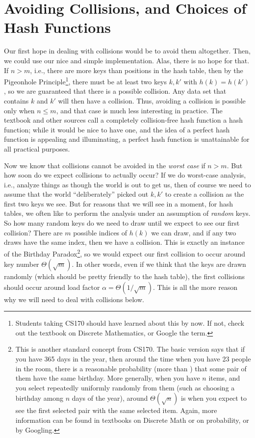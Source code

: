 \section{Avoiding Collisions, and Choices of Hash Functions}
\label{sec:functions}
Our first hope in dealing with collisions would be to avoid them
altogether. Then, we could use our nice and simple implementation.
Alas, there is no hope for that. 
If $n > m$, i.e., there are more keys than positions in the hash
table, then by the Pigeonhole Principle\footnote{Students taking CS170
  should have learned about this by now. If not, check out the textbook on
  Discrete Mathematics, or Google the term.}, there must be at least two
keys $k,k'$ with $h(k) = h(k')$, so we are guaranteed that there is a
possible collision. Any data set that contains $k$ and $k'$ will then
have a collision.
Thus, avoiding a collision is possible only when $n \leq m$, and that
case is much less interesting in practice.
The textbook and other sources call a completely collision-free hash
function a  hash function; while it would be nice to
have one, and the idea of a perfect hash function is appealing and
illuminating, a perfect hash function is unattainable for all
practical purposes.

Now we know that collisions cannot be avoided in the \emph{worst case}
if $n > m$. But how soon do we expect collisions to actually occur?
If we do worst-case analysis, i.e., analyze things as though the world
is out to get us, then of course we need to assume that the world
``deliberately'' picked out $k,k'$ to create a collision as the first
two keys we see.
But for reasons that we will see in a moment, for hash tables, we
often like to perform the analysis under an assumption of \emph{random} keys.
So how many random keys do we need to draw until we expect to see our
first collision?
There are $m$ possible indices of $h(k)$ we can draw, and if any two
draws have the same index, then we have a collision. This is exactly
an instance of the Birthday Paradox\footnote{This is another standard
  concept from CS170. The basic version says that if you have 365 days
  in the year, then around the time when you have 23 people in the
  room, there is a reasonable probability (more than \half) that some
  pair of them have the same birthday. More generally, when you have
  $n$ items, and you select repeatedly uniformly randomly from them
  (such as choosing a birthday among $n$ days of the year), around
  $\Theta(\sqrt{n})$ is when you expect to see the first selected pair
  with the same selected item. Again, more information can be found in
  textbooks on Discrete Math or on probability, or by Googling.}, 
so we would expect our first
collision to occur around key number $\Theta(\sqrt{m})$.
In other words, even if we think that the keys are drawn randomly
(which should be pretty friendly to the hash table), the first
collisions should occur around load factor $\alpha = \Theta(1/\sqrt{m})$.
This is all the more reason why we will need to deal with collisions
below.

